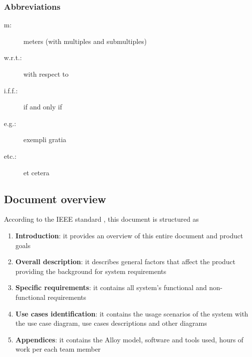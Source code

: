 \subsubsection{Abbreviations}
	\begin{description}
		\item [m:] meters (with multiples and submultiples)
		\item [w.r.t.:] with respect to
		\item [i.f.f.:] if and only if
		\item [e.g.:] exempli gratia
		\item [etc.:] et cetera
	\end{description}

\subsection{Document overview}
According to the IEEE standard \cite{IeeeRasd}, this document is structured as
\begin{enumerate}
	\item \textbf{Introduction}: it provides an overview of this entire document and product goals
	\item \textbf{Overall description}: it describes general factors that affect the product providing the background for system requirements
	\item \textbf{Specific requirements}: it contains all system's functional and non-functional requirements
	\item \textbf{Use cases identification}: it contains the usage scenarios of the system with the use case diagram, use cases descriptions and other diagrams
	\item \textbf{Appendices}: it contains the Alloy model, software and tools used, hours of work per each team member
\end{enumerate}